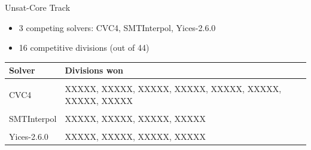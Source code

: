 \documentclass{beamer}
\begin{document}
{
}


\begin{frame}{}
  \begin{center}
    \vfill
      {\huge {}}
    \vfill
  \end{center}
\end{frame}


\begin{frame}{Unsat-Core Track}
  \begin{itemize}
  \item 3 competing solvers: CVC4, SMTInterpol, Yices-2.6.0
  \item 16 competitive divisions (out of 44)
  \end{itemize}

  \bigskip\pause

  \begin{center}
    \begin{tabular}{lp{}}
    Solver      & Divisions won \\ \hline \\[-1.5ex]
    CVC4        & XXXXX, XXXXX, XXXXX, XXXXX, XXXXX, XXXXX, XXXXX, XXXXX \\
    \\[-1.5ex]
    SMTInterpol & XXXXX, XXXXX, XXXXX, XXXXX \\
    \\[-1.5ex]
    Yices-2.6.0 & XXXXX, XXXXX, XXXXX, XXXXX
    \end{tabular}
  \end{center}
\end{frame}

\end{document}
